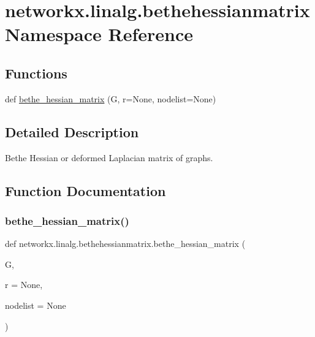 \hypertarget{namespacenetworkx_1_1linalg_1_1bethehessianmatrix}{}\section{networkx.\+linalg.\+bethehessianmatrix Namespace Reference}
\label{namespacenetworkx_1_1linalg_1_1bethehessianmatrix}
\subsection*{Functions}
\begin{DoxyCompactItemize}
\item 
def \hyperlink{namespacenetworkx_1_1linalg_1_1bethehessianmatrix_af6fb2add195d1ceb55e1526e8056132a}{bethe\+\_\+hessian\+\_\+matrix} (G, r=None, nodelist=None)
\end{DoxyCompactItemize}


\subsection{Detailed Description}
\begin{DoxyVerb}Bethe Hessian or deformed Laplacian matrix of graphs.\end{DoxyVerb}
 

\subsection{Function Documentation}
\mbox{\label{namespacenetworkx_1_1linalg_1_1bethehessianmatrix_af6fb2add195d1ceb55e1526e8056132a}} 
\subsubsection{\texorpdfstring{bethe\+\_\+hessian\+\_\+matrix()}{bethe\_hessian\_matrix()}}
{\footnotesize\ttfamily def networkx.\+linalg.\+bethehessianmatrix.\+bethe\+\_\+hessian\+\_\+matrix (\begin{DoxyParamCaption}\item[{}]{G,  }\item[{}]{r = {\ttfamily None},  }\item[{}]{nodelist = {\ttfamily None} }\end{DoxyParamCaption})}

